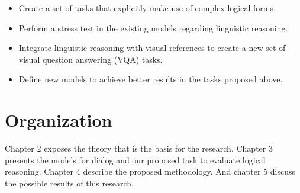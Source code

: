 \begin{itemize}
\item Create a set of tasks that explicitly make use of complex logical forms.
\item Perform a stress test in the existing models regarding linguistic reasoning.
\item Integrate linguistic reasoning with visual references to create a new set of visual question answering (VQA) tasks.
\item Define new models to achieve better results in the tasks proposed above. 
\end{itemize}

\section{Organization}
\label{sec:organization}

Chapter 2 exposes the theory that is the basis for the research. Chapter 3 presents the models for dialog and our proposed task to evaluate logical reasoning. Chapter 4 describe the proposed methodology. And chapter 5 discuss the possible results of this research.
